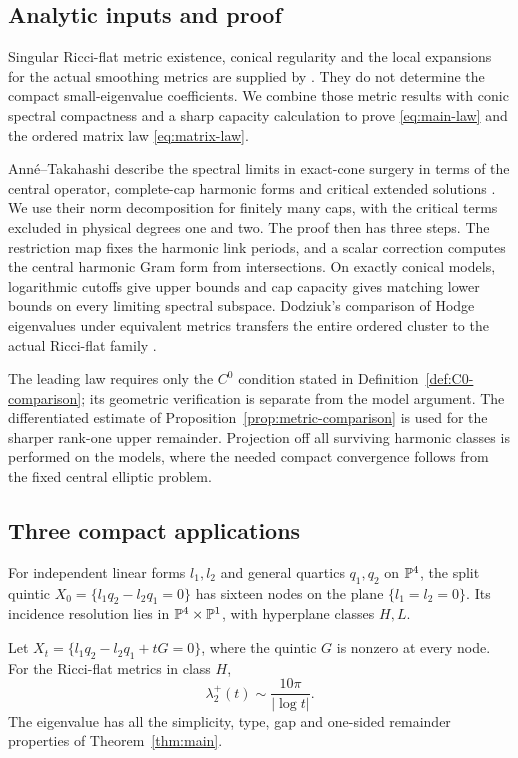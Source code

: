 \subsection{Analytic inputs and proof}
Singular Ricci-flat metric existence, conical regularity and the local
expansions for the actual smoothing metrics are supplied by
\cite{egz,hein-sun,benabida}. They do not determine the compact
small-eigenvalue coefficients. We combine those metric results with
conic spectral compactness and a sharp capacity calculation to prove
\eqref{eq:main-law} and the ordered matrix law \eqref{eq:matrix-law}.

Ann\'e--Takahashi describe the spectral limits in exact-cone surgery
in terms of the central operator, complete-cap harmonic forms and critical
extended solutions \cite{anne-takahashi}. We use their norm decomposition
for finitely many caps, with the critical terms excluded in physical
degrees one and two. The proof then has three steps. The restriction map
fixes the harmonic link periods, and a scalar correction computes the
central harmonic Gram form from intersections. On exactly conical models,
logarithmic cutoffs give upper bounds and cap capacity gives matching lower
bounds on every limiting spectral subspace. Dodziuk's comparison of Hodge
eigenvalues under equivalent metrics transfers the entire ordered cluster
to the actual Ricci-flat family \cite{dodziuk}.

The leading law requires only the $C^0$ condition stated in
Definition~\ref{def:C0-comparison}; its geometric verification is separate
from the model argument. The differentiated estimate of
Proposition~\ref{prop:metric-comparison} is used for the sharper rank-one
upper remainder. Projection off all surviving harmonic classes is performed
on the models, where the needed compact convergence follows from the fixed
central elliptic problem.

\subsection{Three compact applications}
For independent linear forms $l_1,l_2$ and general quartics $q_1,q_2$ on
$\mathbb P^4$, the split quintic $X_0=\{l_1q_2-l_2q_1=0\}$ has sixteen
nodes on the plane $\{l_1=l_2=0\}$. Its incidence resolution lies in
$\mathbb P^4\times\mathbb P^1$, with hyperplane classes $H,L$.

\begin{corollary}\label{cor:quintic}
Let $X_t=\{l_1q_2-l_2q_1+tG=0\}$, where the quintic $G$ is nonzero
at every node. For the Ricci-flat metrics in class $H$,
\[
 \lambda_2^+(t)\sim\frac{10\pi}{|\log t|}.
\]
The eigenvalue has all the simplicity, type, gap and one-sided remainder
properties of Theorem~\ref{thm:main}.
\end{corollary}

